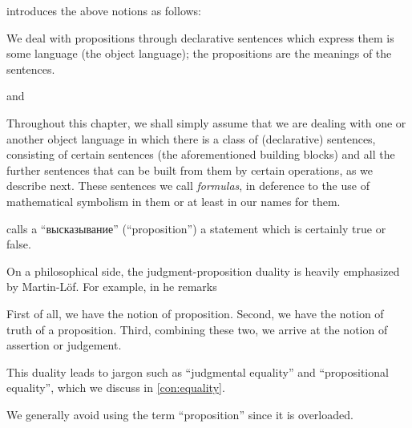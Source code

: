 \begin{comments}
  \item \Textcite[4]{Kleene2002Logic} introduces the above notions as follows:
  \begin{displayquote}
    We deal with propositions through declarative sentences which express them is some language (the object language); the propositions are the
    meanings of the sentences.
  \end{displayquote}
  and
  \begin{displayquote}
    Throughout this chapter, we shall simply assume that we are dealing with one or another object language in which there is a class of (declarative) sentences, consisting of certain sentences (the aforementioned building blocks) and all the further sentences that can be built from them by certain operations, as we describe next. These sentences we call \textit{formulas}, in deference to the use of mathematical symbolism in them or at least in our names for them.
  \end{displayquote}

  \textcite[8]{Эдельман1975Логика} calls a \enquote{высказывание} (\enquote{proposition}) a statement which is certainly true or false.

  \item On a philosophical side, the judgment-proposition duality is heavily emphasized by Martin-L\"of. For example, in \cite[409]{MartinLöf1987Judgments} he remarks
  \begin{displayquote}
    First of all, we have the notion of proposition. Second, we have the notion of truth of a proposition. Third, combining these two, we arrive at the notion of assertion or judgement.
  \end{displayquote}

  This duality leads to jargon such as \enquote{judgmental equality} and \enquote{propositional equality}, which we discuss in \cref{con:equality}.

  \item We generally avoid using the term \enquote{proposition} since it is overloaded.
\end{comments}


